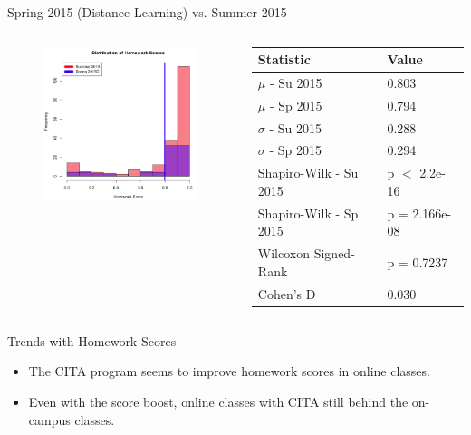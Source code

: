 \documentclass{beamer}
\begin{document}
\begin{frame}{Spring 2015 (Distance Learning) vs. Summer 2015}
\begin{columns}
\begin{column}{2in}
\begin{figure}
	\includegraphics[width=2in]{img/chapter4/hw_su15_vs_sp15d}
\end{figure}
\end{column}
\begin{column}{2in}
\begin{scriptsize}
\begin{table}
  \begin{tabular}{|l|l|}
    \hline
    \textbf{Statistic} & \textbf{Value} \\
	\hline
	$\mu$ - Su 2015 & 0.803 \\
	\hline
	$\mu$ - Sp 2015 & 0.794 \\
	\hline
	$\sigma$ - Su 2015 & 0.288 \\
	\hline
	$\sigma$ - Sp 2015 & 0.294 \\
	\hline
	Shapiro-Wilk - Su 2015 & p $<$ 2.2e-16 \\
	\hline
	Shapiro-Wilk - Sp 2015 & p = 2.166e-08 \\
	\hline
	Wilcoxon Signed-Rank & p = 0.7237 \\
	\hline
	Cohen's D & 0.030 \\
	\hline
  \end{tabular}
\end{table}
\end{scriptsize}
\end{column}
\end{columns}
\end{frame}

\begin{frame}{Trends with Homework Scores}
  \begin{itemize}
    \item The CITA program seems to improve homework scores in online classes.
    \item Even with the score boost, online classes with CITA still behind the on-campus classes.
  \end{itemize}
\end{frame}
\end{document}
